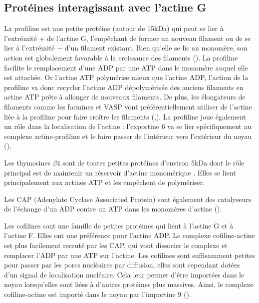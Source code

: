 \subsection{Protéines interagissant avec l'actine G}

 La profiline est une petite protéine (autour de 15kDa) qui peut se lier à l'extrémité + de l'actine G, l'empêchant de former un nouveau filament ou de se lier à l'extrémité $-$ d'un filament existant. 
Bien qu'elle se lie au monomère, son action est globalement favorable à la croissance des filaments (\cite{pollard_quantitative_1984}). 
La profiline facilite le remplacement d'une ADP par une ATP dans le monomère auquel elle est attachée. 
Or l'actine ATP polymérise mieux que l'actine ADP, l'action de la profiline va donc recycler l'actine ADP dépolymérisée des anciens filaments en actine ATP prête à allonger de nouveaux filaments. 
De plus, les élongateurs de filaments comme les formines et VASP vont préférentiellement utiliser de l'actine liée à la profiline pour faire croître les filaments (\cite{ferron_structural_2007},\cite{romero_formin_2004}). 
La profiline joue également un rôle dans la localisation de l'actine : l'exportine 6 va se lier spécifiquement au complexe actine-profiline et le faire passer de l'intérieur vers l'extérieur du noyau (\cite{dopie_active_2012}).


Les thymosines $\beta 4$ sont de toutes petites protéines d'environ 5kDa dont le rôle principal est de maintenir un réservoir d'actine monomérique \parencite{safer_isolation_1990}. Elles se lient principalement aux actines ATP et les empêchent de polymériser. 

Les CAP (Adenylate Cyclase Associated Protein) sont également des catalyseurs de l'échange d'un ADP contre un ATP dans les monomères d'actine (\cite{makkonen_mammalian_2013}). 

Les cofilines sont une famille de petites protéines qui lient à l'actine G et à l'actine F. Elles ont une préférence pour l'actine ADP. 
Le complexe cofiline-actine est plus facilement recruté par les CAP, qui vont  dissocier le complexe et remplacer l'ADP par une ATP sur l'actine. 
Les cofilines sont suffisamment petites pour passer par les pores nucléaires par diffusion, elles sont cependant dotées d'un signal de localisation nucléaire. Cela leur permet d'être importées dans le noyau lorsqu'elles sont liées à d'autres protéines plus massives. 
Ainsi, le complexe cofiline-actine est importé dans le noyau par l'importine 9 (\cite{dopie_active_2012}).

